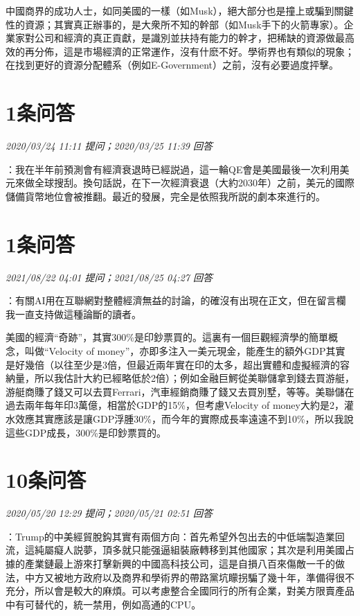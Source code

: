 \documentclass[twocolumn]{ctexart}
\begin{document}
中國商界的成功人士，如同美國的一樣（如Musk），絕大部分也是撞上或騙到關鍵性的資源；其實真正辦事的，是大衆所不知的幹部（如Musk手下的火箭專家）。企業家對公司和經濟的真正貢獻，是識別並扶持有能力的幹才，把稀缺的資源做最高效的再分佈，這是市場經濟的正常運作，沒有什麽不好。學術界也有類似的現象；在找到更好的資源分配體系（例如E-Government）之前，沒有必要過度抨擊。
\\

\section{1条问答}

\textit{\hfill\noindent\small 2020/03/24 11:11 提问；2020/03/25 11:39 回答}

：我在半年前預測會有經濟衰退時已經説過，這一輪QE會是美國最後一次利用美元來做全球搜刮。換句話説，在下一次經濟衰退（大約2030年）之前，美元的國際儲備貨幣地位會被推翻。最近的發展，完全是依照我所説的劇本來進行的。
\\

\section{1条问答}

\textit{\hfill\noindent\small 2021/08/22 04:01 提问；2021/08/25 04:27 回答}

：有關AI用在互聯網對整體經濟無益的討論，的確沒有出現在正文，但在留言欄我一直支持做這種論斷的讀者。

美國的經濟“奇跡”，其實300\%是印鈔票買的。這裏有一個巨觀經濟學的簡單概念，叫做“Velocity of money”，亦即多注入一美元現金，能產生的額外GDP其實是好幾倍（以往至少是3倍，但最近兩年實在印的太多，超出實體和虛擬經濟的容納量，所以我估計大約已經略低於2倍）；例如金融巨鰐從美聯儲拿到錢去買游艇，游艇商賺了錢又可以去買Ferrari，汽車經銷商賺了錢又去買別墅，等等。美聯儲在過去兩年每年印3萬億，相當於GDP的15\%，但考慮Velocity of money大約是2，灌水效應其實應該是讓GDP浮腫30\%，而今年的實際成長率遠遠不到10\%，所以我說這些GDP成長，300\%是印鈔票買的。
\\

\section{10条问答}

\textit{\hfill\noindent\small 2020/05/20 12:29 提问；2020/05/21 02:51 回答}

：Trump的中美經貿脫鈎其實有兩個方向：首先希望外包出去的中低端製造業回流，這純屬癡人説夢，頂多就只能强逼組裝廠轉移到其他國家；其次是利用美國占據的產業鏈最上游來打擊新興的中國高科技公司，這是自損八百來傷敵一千的做法，中方又被地方政府以及商界和學術界的帶路黨坑矇拐騙了幾十年，準備得很不充分，所以會是較大的麻煩。可以考慮整合全國同行的所有企業，對美方限賣產品中有可替代的，統一禁用，例如高通的CPU。
\\
\end{document}
